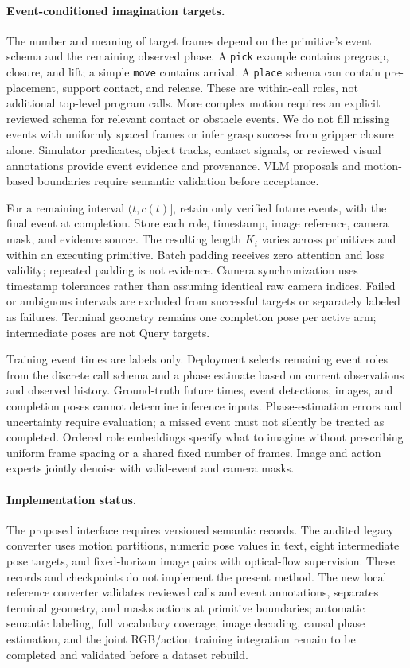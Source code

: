 \paragraph{Event-conditioned imagination targets.}
The number and meaning of target frames depend on the primitive's event schema and the remaining observed phase. A \texttt{pick} example contains pregrasp, closure, and lift; a simple \texttt{move} contains arrival. A \texttt{place} schema can contain pre-placement, support contact, and release. These are within-call roles, not additional top-level program calls. More complex motion requires an explicit reviewed schema for relevant contact or obstacle events. We do not fill missing events with uniformly spaced frames or infer grasp success from gripper closure alone. Simulator predicates, object tracks, contact signals, or reviewed visual annotations provide event evidence and provenance. VLM proposals and motion-based boundaries require semantic validation before acceptance.

For a remaining interval $(t,c(t)]$, retain only verified future events, with the final event at completion. Store each role, timestamp, image reference, camera mask, and evidence source. The resulting length $K_i$ varies across primitives and within an executing primitive. Batch padding receives zero attention and loss validity; repeated padding is not evidence. Camera synchronization uses timestamp tolerances rather than assuming identical raw camera indices. Failed or ambiguous intervals are excluded from successful targets or separately labeled as failures. Terminal geometry remains one completion pose per active arm; intermediate poses are not Query targets.

Training event times are labels only. Deployment selects remaining event roles from the discrete call schema and a phase estimate based on current observations and observed history. Ground-truth future times, event detections, images, and completion poses cannot determine inference inputs. Phase-estimation errors and uncertainty require evaluation; a missed event must not silently be treated as completed. Ordered role embeddings specify what to imagine without prescribing uniform frame spacing or a shared fixed number of frames. Image and action experts jointly denoise with valid-event and camera masks.

\paragraph{Implementation status.}
The proposed interface requires versioned semantic records. The audited legacy converter uses motion partitions, numeric pose values in text, eight intermediate pose targets, and fixed-horizon image pairs with optical-flow supervision. These records and checkpoints do not implement the present method. The new local reference converter validates reviewed calls and event annotations, separates terminal geometry, and masks actions at primitive boundaries; automatic semantic labeling, full vocabulary coverage, image decoding, causal phase estimation, and the joint RGB/action training integration remain to be completed and validated before a dataset rebuild.

